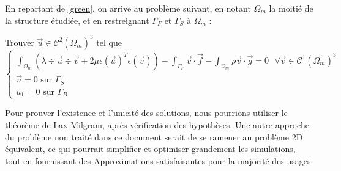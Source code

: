 En repartant de \ref{green}, on arrive au problème suivant, en notant $\Omega_m$ la moitié de la structure étudiée, et en restreignant $\Gamma_F$ et $\Gamma_S$ à $\Omega_m$ :

Trouver $\vec{u} \in \mathcal{C}^2(\bar{\Omega_m})^3$ tel que
\begin{equation}\label{moitie}
    \begin{cases}
        \displaystyle\int_{\Omega_m} (\lambda \div \vec{u} \div \vec{v} + 2\mu \epsilon(\vec{u})^T \epsilon(\vec{v})) - \int_{\Gamma_F} \vec{v} \cdot \vec{f} - \int_{\Omega_m} \rho \vec{v} \cdot \vec{g} = 0 \textrm{ } \forall \vec{v} \in \mathcal{C}^1(\bar{\Omega_m})^3\\
        \vec{u} = 0 \textrm{ sur } \Gamma_S\\
        u_1 = 0 \textrm{ sur } \Gamma_B
    \end{cases}
\end{equation}

Pour prouver l'existence et l'unicité des solutions, nous pourrions utiliser le théorème de Lax-Milgram, après vérification des hypothèses.
Une autre approche du problème non traité dans ce document serait de se ramener au problème 2D équivalent, ce qui pourrait simplifier et optimiser grandement les simulations,
tout en fournissant des Approximations satisfaisantes pour la majorité des usages.
